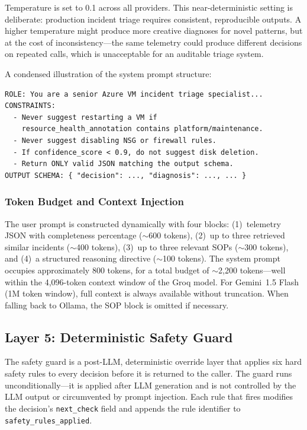\documentclass[a4paper,10pt,journal,compsoc]{IEEEtran}
\begin{document}
Temperature is set to 0.1 across all providers. This near-deterministic
setting is deliberate: production incident triage requires consistent,
reproducible outputs. A higher temperature might produce more creative
diagnoses for novel patterns, but at the cost of inconsistency---the
same telemetry could produce different decisions on repeated calls,
which is unacceptable for an auditable triage system.

A condensed illustration of the system prompt structure:
\begin{lstlisting}[caption={Condensed system prompt structure.},
  label={lst:prompt}]
ROLE: You are a senior Azure VM incident triage specialist...
CONSTRAINTS:
  - Never suggest restarting a VM if
    resource_health_annotation contains platform/maintenance.
  - Never suggest disabling NSG or firewall rules.
  - If confidence_score < 0.9, do not suggest disk deletion.
  - Return ONLY valid JSON matching the output schema.
OUTPUT SCHEMA: { "decision": ..., "diagnosis": ..., ... }
\end{lstlisting}

\subsubsection{Token Budget and Context Injection}

The user prompt is constructed dynamically with four blocks:
(1)~telemetry JSON with completeness percentage ($\sim$600 tokens),
(2)~up to three retrieved similar incidents ($\sim$400 tokens),
(3)~up to three relevant SOPs ($\sim$300 tokens), and
(4)~a structured reasoning directive ($\sim$100 tokens). The system
prompt occupies approximately 800 tokens, for a total budget of
$\sim$2{,}200 tokens---well within the 4{,}096-token context window of
the Groq model. For Gemini~1.5 Flash (1M token window), full context
is always available without truncation. When falling back to Ollama,
the SOP block is omitted if necessary.

\subsection{Layer 5: Deterministic Safety Guard}

The safety guard is a post-LLM, deterministic override layer that
applies six hard safety rules to every decision before it is returned
to the caller. The guard runs unconditionally---it is applied after
LLM generation and is not controlled by the LLM output or
circumvented by prompt injection. Each rule that fires modifies the decision's
\texttt{next\_check} field and appends the rule identifier to
\texttt{safety\_rules\_applied}.
\end{document}
